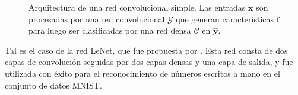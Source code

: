 \begin{figure}[H]

  \caption[Red neuronal convolucional]{Arquitectura de una red convolucional simple. Las entradas $\mathbf{x}$ son procesadas por una red convolucional $\mathcal{G}$
    que generan características $\mathbf{f}$ para luego ser clasificadas por una red densa $\mathcal{C}$ en $\mathbf{\hat{y}}$.}
  \label{fig:cnn}
\end{figure}

Tal es el caso de la red LeNet, que fue propuesta por \cite{lecun1998gradient}. Esta red consta de dos capas de
convolución seguidas por dos capas densas y una capa de salida, y fue utilizada con éxito para el reconocimiento de
números escritos a mano en el conjunto de datos MNIST.

